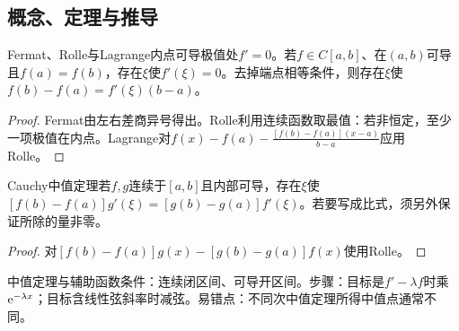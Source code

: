 \subsection{概念、定理与推导}

\begin{theorem}{Fermat、Rolle与Lagrange}内点可导极值处$f\prime=0$。若$f\in C[a,b]$、在$(a,b)$可导且$f(a)=f(b)$，存在$\xi$使$f\prime(\xi)=0$。去掉端点相等条件，则存在$\xi$使$f(b)-f(a)=f\prime(\xi)(b-a)$。\end{theorem}
\begin{proof}Fermat由左右差商异号得出。Rolle利用连续函数取最值：若非恒定，至少一项极值在内点。Lagrange对$f(x)-f(a)-\frac{[f(b)-f(a)](x-a)}{b-a}$应用Rolle。\end{proof}
\begin{theorem}{Cauchy中值定理}若$f,g$连续于$[a,b]$且内部可导，存在$\xi$使$[f(b)-f(a)]g\prime(\xi)=[g(b)-g(a)]f\prime(\xi)$。若要写成比式，须另外保证所除的量非零。\end{theorem}
\begin{proof}对$[f(b)-f(a)]g(x)-[g(b)-g(a)]f(x)$使用Rolle。\end{proof}

\begin{method}{中值定理与辅助函数}条件：连续闭区间、可导开区间。步骤：目标是$f\prime-\lambda f$时乘$\mathrm{e}^{-\lambda x}$；目标含线性弦斜率时减弦。易错点：不同次中值定理所得中值点通常不同。\end{method}
